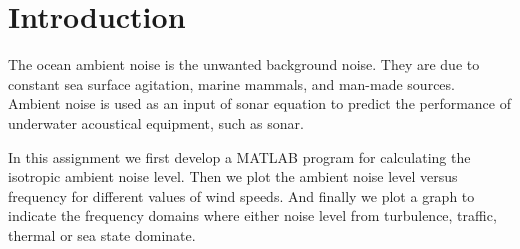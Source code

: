  \chapter*{Introduction}

\noindent The ocean ambient noise is the unwanted background noise. They are due to constant sea surface agitation, marine mammals, and man-made sources. Ambient noise is used as an input of sonar equation to predict the performance of underwater acoustical equipment, such as sonar. 

\noindent In this assignment we first develop a MATLAB program for calculating the isotropic ambient noise level. Then we plot the ambient noise level versus frequency for different values of wind speeds. And finally we plot a graph to indicate the frequency domains where either noise level from turbulence, traffic, thermal or sea state dominate.




